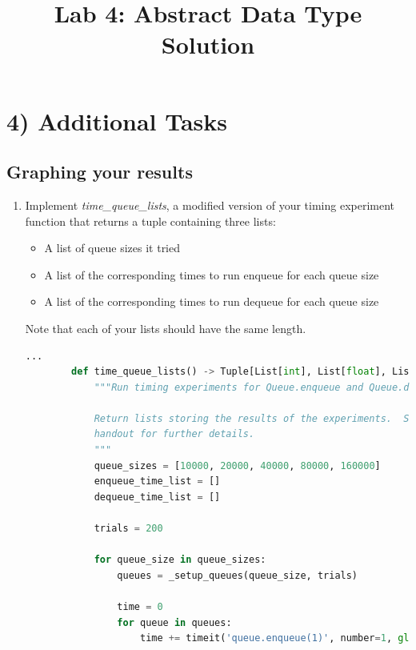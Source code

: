 \documentclass[12pt]{article}
\begin{document}
\title{Lab 4: Abstract Data Type Solution}
\date{}
\maketitle

\section*{4) Additional Tasks}
\subsection*{Graphing your results}
\begin{enumerate}[1.]
    \item Implement \textit{time\_queue\_lists}, a modified version of your timing
    experiment function that returns a tuple containing three lists:

    \begin{itemize}
        \item A list of queue sizes it tried
        \item A list of the corresponding times to run enqueue for each queue size
        \item A list of the corresponding times to run dequeue for each queue size
    \end{itemize}

    \bigskip

    Note that each of your lists should have the same length.

    \bigskip

    \begin{mdframed}
        \begin{lstlisting}[language=Python,caption={task\_4\_q1\_part\_1\_solution.py},captionpos=b]
        ...
        def time_queue_lists() -> Tuple[List[int], List[float], List[float]]:
            """Run timing experiments for Queue.enqueue and Queue.dequeue.

            Return lists storing the results of the experiments.  See the lab
            handout for further details.
            """
            queue_sizes = [10000, 20000, 40000, 80000, 160000]
            enqueue_time_list = []
            dequeue_time_list = []

            trials = 200

            for queue_size in queue_sizes:
                queues = _setup_queues(queue_size, trials)

                time = 0
                for queue in queues:
                    time += timeit('queue.enqueue(1)', number=1, globals=locals())


\end{lstlisting}
\end{mdframed}
\end{enumerate}
\end{document}
